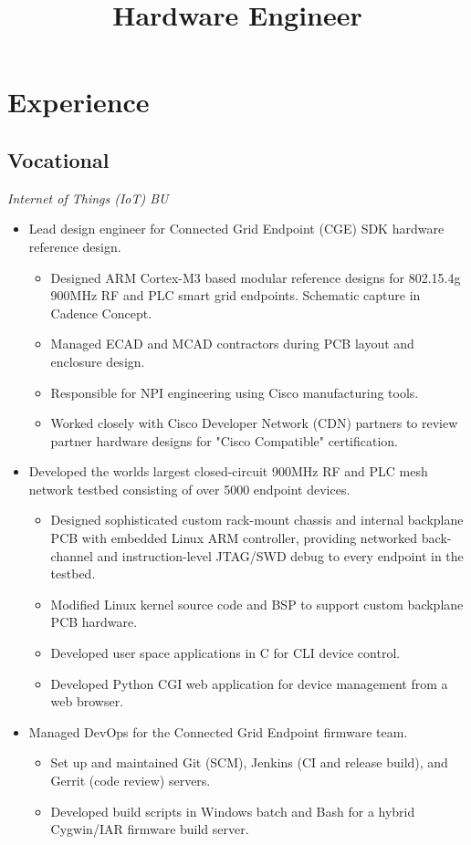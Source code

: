 \documentclass[11pt,a4paper]{moderncv}
\title{Hardware Engineer}
\begin{document}
\makecvtitle

\section{Experience}
\subsection{Vocational}
{
  \textit{Internet of Things (IoT) BU}
  \begin{itemize}
  \item Lead design engineer for Connected Grid Endpoint (CGE) SDK hardware reference design.
    \begin{itemize}
      \item Designed ARM Cortex-M3 based modular reference designs for 802.15.4g 900MHz RF and PLC smart grid endpoints.  Schematic capture in Cadence Concept.
      \item Managed ECAD and MCAD contractors during PCB layout and enclosure design.
      \item Responsible for NPI engineering using Cisco manufacturing tools.
      \item Worked closely with Cisco Developer Network (CDN) partners to review partner hardware designs for "Cisco Compatible" certification.
    \end{itemize}
  \item Developed the worlds largest closed-circuit 900MHz RF and PLC mesh network testbed consisting of over 5000 endpoint devices.
    \begin{itemize}
    \item Designed sophisticated custom rack-mount chassis and internal backplane PCB with embedded Linux ARM controller, providing networked back-channel and instruction-level JTAG/SWD debug to every endpoint in the testbed.
    \item Modified Linux kernel source code and BSP to support custom backplane PCB hardware.
    \item Developed user space applications in C for CLI device control.
    \item Developed Python CGI web application for device management from a web browser.
    \end{itemize}
  \item Managed DevOps for the Connected Grid Endpoint firmware team.
    \begin{itemize}
    \item Set up and maintained Git (SCM), Jenkins (CI and release build), and Gerrit (code review) servers.
    \item Developed build scripts in Windows batch and Bash for a hybrid Cygwin/IAR firmware build server.
    \end{itemize}
  \end{itemize}
}
\end{document}
